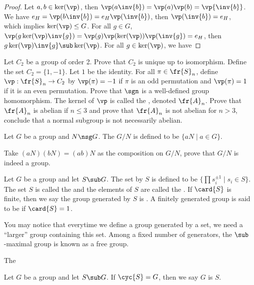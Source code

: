 \documentclass[10pt]{article}
\begin{document}
\begin{proof}
    Let $a,b\in\ker(\vp)$, then $\vp(a\inv{b})=\vp(a)\vp(b)=\vp{\inv{b}}$. We have ${e}_{H}=\vp(b\inv{b})={e}_{H}\vp(\inv{b})$, then $\vp({\inv{b}})={e}_{H}$, which implies $\ker(\vp)\le G$. For all $g\in G$, $\vp(g\ker(\vp)\inv{g})=\vp(g)\vp(\ker(\vp))\vp(\inv{g})={e}_{H}$, then $g\ker(\vp)\inv{g}\sub\ker(\vp)$. For all $g\in\ker(\vp)$, we have 
\end{proof}
\begin{problem}
    Let ${C}_{2}$ be a group of order 2. Prove that ${C}_{2}$ is unique up to isomorphism. Define the set ${C}_{2}=\{1,-1\}$. Let $1$ be the identity. For all $\pi\in{\fr{S}}_{n}$, define $\vp:{\fr{S}}_{n}\to{C}_{2}$ by $\vp(\pi)=-1$ if $\pi$ is an odd permutation and $\vp(\pi)=1$ if it is an even permutation. Prove that $\sgn$ is a well-defined group homomorphism. The kernel of $\vp$ is called the , denoted ${\fr{A}}_{n}$. Prove that ${\fr{A}}_{n}$ is abelian if $n\le 3$ and prove that ${\fr{A}}_{n}$ is not abelian for $n>3$, conclude that a normal subgroup is not necessarily abelian.
\end{problem}
\begin{definition}
    Let $G$ be a group and $N\nsg G$. The  $G/N$ is defined to be $\{aN\mid a\in G\}$. 
\end{definition}
\begin{problem}
    Take $(aN)(bN)=(ab)N$ as the composition on $G/N$, prove that $G/N$ is indeed a group.
\end{problem}
\begin{definition}
    Let $G$ be a group and let $S\sub G$. The set  by $S$ is defined to be $\{\prod{s}_{i}^{\pm 1}\mid{s}_{i}\in S\}$. The set $S$ is called the  and the elements of $S$ are called the . If $\card{S}$ is finite, then we say the group generated by $S$ is . A finitely generated group is said to be  if $\card{S}=1$.
\end{definition}
\par
You may notice that everytime we define a group generated by a set, we need a ``larger'' group containing this set. Among a fixed number of generators, the $\sub$-maximal group is known as a free group. 
\begin{definition}
    The 
\end{definition}
\par
Let $G$ be a group and let $S\sub G$. If $\cyc{S}=G$, then we say $G$ is  $S$.
\end{document}
